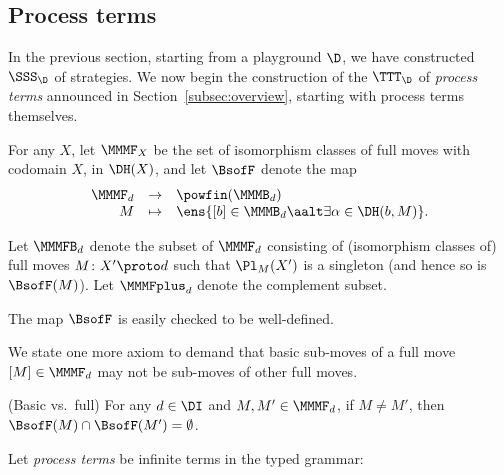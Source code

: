 \documentclass{LMCS}
\renewcommand{\with}[1]{\langle #1 \rangle}
\theoremstyle{plain}\newtheorem{satz}[thm]{Satz}
\begin{document}
\subsection{Process terms}\label{sec:syn}
In the previous section, starting from a playground $\D$, we have
constructed \anlts{} $\SSS_\D$ of strategies. We now begin the
construction of the \lts{} $\TTT_\D$ of \emph{process terms} announced
in Section~\ref{subsec:overview}, starting with process terms themselves.

\begin{defi}\label{defn:MMM}
  For any $X$, let $\MMMF_X$ be the set of isomorphism classes of full
  moves with codomain $X$, in $\DH (X)$, and let $\BsofF$ denote the map
  $$\begin{array}[t]{rcl}
    \MMMF_d & \to & \powfin(\MMMB_d) \\
    M & \mapsto & \ens{ [b] \in \MMMB_d \aalt \exists \alpha \in \DH(b,M) }.
  \end{array}$$

  Let $\MMMFB_d$ denote the subset of $\MMMF_d$ consisting of
  (isomorphism classes of) full moves $M \colon X' \proto d$ such that
  $\Pl_M (X')$ is a singleton (and hence so is $\BsofF (M)$).  Let
  $\MMMFplus_d$ denote the complement subset.
\end{defi}
The map $\BsofF$ is easily checked to be well-defined.

We state one more axiom to demand that basic sub-moves of a full move
$[M] \in \MMMF_d$ may not be sub-moves of other full moves.
\begin{ax}
  \begin{axioms}
  \item (Basic vs.\ full) For any $d \in \DI$ and $M, M'
    \in \MMMF_d$, if $M \neq M'$, then $\BsofF(M) \cap \BsofF(M')
    = \emptyset$.
    \label{basic:full}
  \end{axioms}
\end{ax}


  Let \emph{process terms} be infinite terms in the typed grammar:
\end{document}
